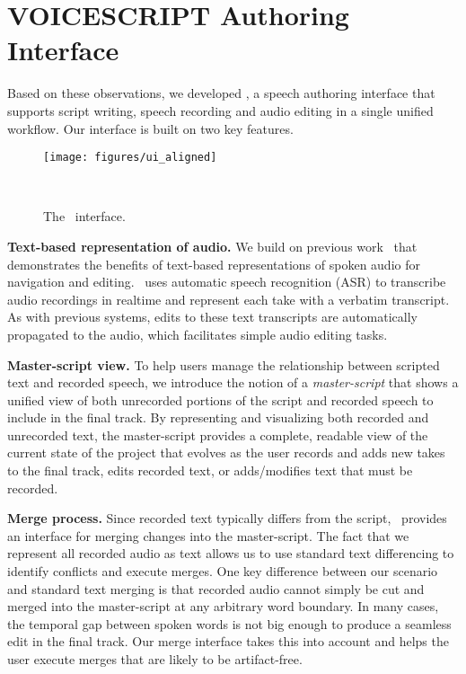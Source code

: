 \section{VOICESCRIPT Authoring Interface}

Based on these observations, we developed \systemname, a speech authoring interface that supports script writing, speech recording and audio editing in a single unified workflow. Our interface is built on two key features.

\begin{figure*}
  \centering
  \texttt{[image: figures/ui\_aligned]}
  \caption{The \systemname\ interface. }~\label{fig:ui_aligned}
\end{figure*}

\textbf{Text-based representation of audio.} We build on previous work~\cite{casares2002simplifying,whittaker2004semantic,berthouzoz2012tools,rubin2013content} that demonstrates the benefits of text-based representations of spoken audio for navigation and editing. \systemname\ uses automatic speech recognition (ASR) to transcribe audio recordings in realtime and represent each take with a verbatim transcript. As with previous systems, edits to these text transcripts are automatically propagated to the audio, which facilitates simple audio editing tasks. 

\textbf{Master-script view.} To help users manage the relationship between scripted text and recorded speech, we introduce the notion of a \emph{master-script} that shows a unified view of both unrecorded portions of the script and recorded speech to include in the final track. By representing and visualizing both recorded and unrecorded text, the master-script provides a complete, readable view of the current state of the project that evolves as the user records and adds new takes to the final track, edits recorded text, or adds/modifies text that must be recorded. 

\textbf{Merge process.} Since recorded text typically differs from the script, \systemname\ provides an interface for merging changes into the master-script. The fact that we represent all recorded audio as text allows us to use standard text differencing to identify conflicts and execute merges. One key difference between our scenario and standard text merging is that recorded audio cannot simply be cut and merged into the master-script at any arbitrary word boundary. In many cases, the temporal gap between spoken words is not big enough to produce a seamless edit in the final track. Our merge interface takes this into account and helps the user execute merges that are likely to be artifact-free.

